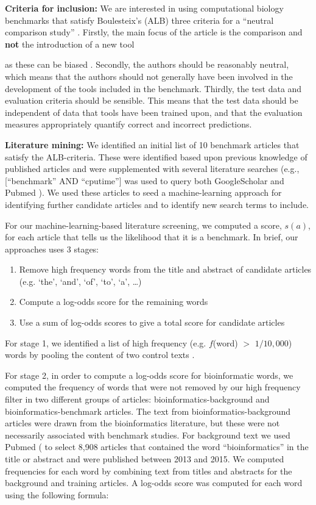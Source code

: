 \documentclass{bmcart}
\begin{document}
\textbf{Criteria for inclusion:} We are interested in using
computational biology benchmarks that satisfy Boulesteix’s
(ALB) three criteria for a ``neutral comparison study''
\cite{Boulesteix2013-vb}. Firstly, the main focus of the article is
the comparison and \textbf{not} the introduction of a new
tool {{\color{red}as these can be biased} \cite{Buchka:2021a}. Secondly, the authors should be reasonably neutral, which means
that the authors should not generally have been involved in the
development of the tools included in the benchmark. Thirdly, the test
data and evaluation criteria should be sensible. This means that the
test data should be independent of data that tools have been trained
upon, and that the evaluation measures appropriately quantify correct
and incorrect predictions.

\textbf{Literature mining:} We identified an initial list of 10 benchmark
articles that satisfy the ALB-criteria. These were identified based
upon previous knowledge of published articles and were supplemented
with several literature searches (e.g., [``benchmark'' AND ``cputime''] was
used to query both GoogleScholar and Pubmed
\cite{Sayers2010-vm,McEntyre2001-fl}). We used these articles to seed
a machine-learning approach for identifying further candidate articles
and to identify new search terms to include.

For our machine-learning-based literature screening, we computed a
score, $s(a)$, for each article that tells us the likelihood that it
is a benchmark. In brief, our approaches uses 3 stages:
\begin{enumerate}
\item Remove high frequency words from the title and abstract of candidate articles (e.g. ‘the’, ‘and’, ‘of’, ‘to’, ‘a’, …) 
\item Compute a log-odds score for the remaining words 
\item Use a sum of log-odds scores to give a total score for candidate articles
\end{enumerate}
For stage 1, we identified a list of high frequency (e.g. $f$(word) $>$
$1/10,000$) words by pooling the content of two control texts
\cite{Carroll1865-hk,Tolkien1937-ke}.

For stage 2, in order to compute a log-odds score for bioinformatic
words, we computed the frequency of words that were not removed by our
high frequency filter in two different groups of articles:
bioinformatics-background and bioinformatics-benchmark articles. The
text from bioinformatics-background articles were drawn from the
bioinformatics literature, but these were not necessarily associated
with benchmark studies. For background text we used Pubmed
(\cite{Sayers2010-vm,McEntyre2001-fl} to select 8,908 articles that
contained the word “bioinformatics” in the title or abstract and were
published between 2013 and 2015. We computed frequencies for each word
by combining text from titles and abstracts for the background and
training articles. A log-odds score was computed for each word using
the following formula:

}
\end{document}
